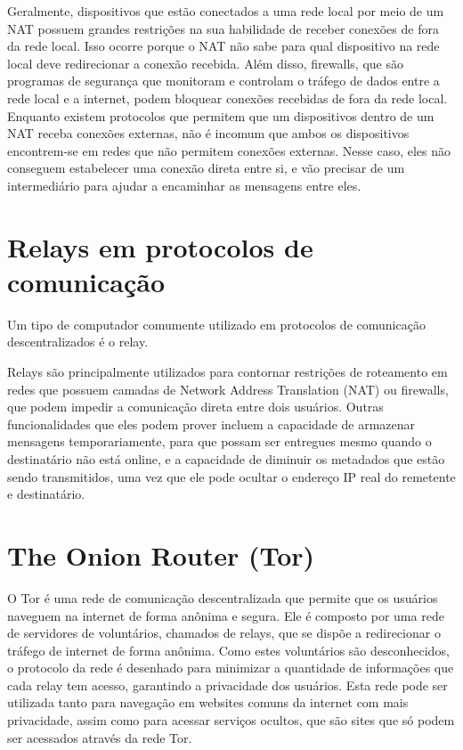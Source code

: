Geralmente, dispositivos que estão conectados a uma rede local por meio de um NAT possuem grandes restrições na sua habilidade de receber conexões de fora da rede local. Isso ocorre porque o NAT não sabe para qual dispositivo na rede local deve redirecionar a conexão recebida. Além disso, firewalls, que são programas de segurança que monitoram e controlam o tráfego de dados entre a rede local e a internet, podem bloquear conexões recebidas de fora da rede local. Enquanto existem protocolos que permitem que um dispositivos dentro de um NAT receba conexões externas, não é incomum que ambos os dispositivos encontrem-se em redes que não permitem conexões externas. Nesse caso, eles não conseguem estabelecer uma conexão direta entre si, e vão precisar de um intermediário para ajudar a encaminhar as mensagens entre eles.

\section {Relays em protocolos de comunicação}

Um tipo de computador comumente utilizado em protocolos de comunicação descentralizados é o relay.


Relays são principalmente utilizados para contornar restrições de roteamento em redes que possuem camadas de Network Address Translation (NAT) ou firewalls, que podem impedir a comunicação direta entre dois usuários. Outras funcionalidades que eles podem prover incluem a capacidade de armazenar mensagens temporariamente, para que possam ser entregues mesmo quando o destinatário não está online, e a capacidade de diminuir os metadados que estão sendo transmitidos, uma vez que ele pode ocultar o endereço IP real do remetente e destinatário.

\section{The Onion Router (Tor)}

O Tor é uma rede de comunicação descentralizada que permite que os usuários naveguem na internet de forma anônima e segura. Ele é composto por uma rede de servidores de voluntários, chamados de relays, que se dispõe a redirecionar o tráfego de internet de forma anônima. Como estes voluntários são desconhecidos, o protocolo da rede é desenhado para minimizar a quantidade de informações que cada relay tem acesso, garantindo a privacidade dos usuários. Esta rede pode ser utilizada tanto para navegação em websites comuns da internet com mais privacidade, assim como para acessar serviços ocultos, que são sites que só podem ser acessados através da rede Tor.

